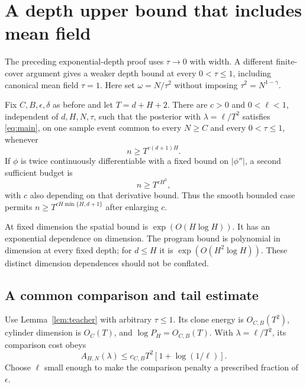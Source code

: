 \section{A depth upper bound that includes mean field}
\label{sec:all-scales}
The preceding exponential-depth proof uses $\tau\to0$ with width. A different finite-cover argument gives a weaker depth bound at every $0<\tau\le1$, including canonical mean field $\tau=1$. Here set $\omega=N/\tau^2$ without imposing $\tau^2=N^{1-\gamma}$.

\begin{theorem}
\label{thm:all-scales}
Fix $C,B,\epsilon,\delta$ as before and let $T=d+H+2$. There are $c>0$ and $0<\ell<1$, independent of $d,H,N,\tau$, such that the posterior with $\lambda=\ell/T^2$ satisfies \eqref{eq:main}, on one sample event common to every $N\ge C$ and every $0<\tau\le1$, whenever
\begin{equation}
 n\ge T^{c(d+1)H}.
 \label{eq:spatial-depth-budget}
\end{equation}
If $\phi$ is twice continuously differentiable with a fixed bound on $|\phi''|$, a second sufficient budget is
\begin{equation}
 n\ge T^{cH^2},
 \label{eq:program-depth-budget}
\end{equation}
with $c$ also depending on that derivative bound. Thus the smooth bounded case permits $n\ge T^{cH\min\{H,d+1\}}$ after enlarging $c$.
\end{theorem}

At fixed dimension the spatial bound is $\exp(O(H\log H))$. It has an exponential dependence on dimension. The program bound is polynomial in dimension at every fixed depth; for $d\le H$ it is $\exp(O(H^2\log H))$. These distinct dimension dependences should not be conflated.

\subsection{A common comparison and tail estimate}
Use Lemma~\ref{lem:teacher} with arbitrary $\tau\le1$. Its clone energy is $O_{C,B}(T^2)$, cylinder dimension is $O_C(T)$, and $\log P_H=O_{C,B}(T)$. With $\lambda=\ell/T^2$, its comparison cost obeys
\[
 A_{H,N}(\lambda)\le c_{C,B}T^2[1+\log(1/\ell)].
\]
Choose $\ell$ small enough to make the comparison penalty a prescribed fraction of $\epsilon$.

